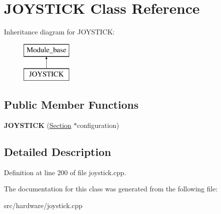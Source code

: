 \hypertarget{classJOYSTICK}{\section{J\-O\-Y\-S\-T\-I\-C\-K Class Reference}
\label{classJOYSTICK}
}
Inheritance diagram for J\-O\-Y\-S\-T\-I\-C\-K\-:\begin{figure}[H]
\begin{center}
\leavevmode
\includegraphics[height=2.000000cm]{classJOYSTICK}
\end{center}
\end{figure}
\subsection*{Public Member Functions}
\begin{DoxyCompactItemize}
\item 
\hypertarget{classJOYSTICK_a0514bda9906877426a42ab28f36154c1}{{\bfseries J\-O\-Y\-S\-T\-I\-C\-K} (\hyperlink{classSection}{Section} $\ast$configuration)}\label{classJOYSTICK_a0514bda9906877426a42ab28f36154c1}

\end{DoxyCompactItemize}


\subsection{Detailed Description}


Definition at line 200 of file joystick.\-cpp.



The documentation for this class was generated from the following file\-:\begin{DoxyCompactItemize}
\item 
src/hardware/joystick.\-cpp\end{DoxyCompactItemize}
